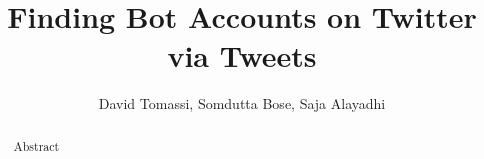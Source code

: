 \documentclass[a4paper,12pt]{article}
\title{Finding Bot Accounts on Twitter via Tweets}
\author{David Tomassi, Somdutta Bose, Saja Alayadhi}
\begin{document}
\maketitle

\begin{abstract}
Abstract
\end{abstract}

















\end{document}
